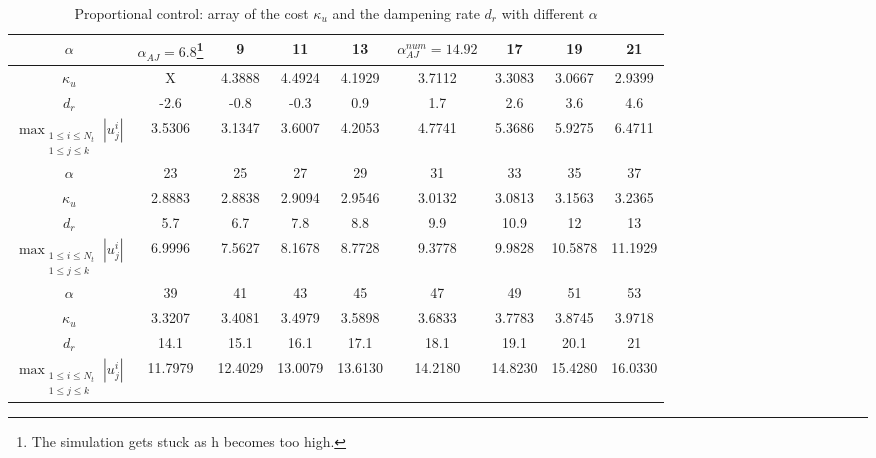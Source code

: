 \documentclass[12pt]{article}
\begin{document}
\begin{table}[ht]
    \caption{Proportional control: array of the cost $\kappa_u$ and the dampening rate $d_r$ with different $\alpha$}
    \label{tab:propctrl_cost}
    \hspace*{-1.75cm}
    \begin{tabular}{ |c|c|c|c|c|c|c|c|c| }
    \hline
    $\alpha$ & $\alpha_{AJ}= 6.8$\footnote{The simulation gets stuck as h becomes too high.}& 9 & 11 & 13& $\alpha_{AJ}^{num}=14.92$ & 17& 19& 21\\
    \hline
    $\kappa_u$ & X & 4.3888 & 4.4924 & 4.1929& 3.7112 & 3.3083& 3.0667 & 2.9399 \\
    $d_r$ & -2.6 & -0.8 & -0.3 & 0.9& 1.7 & 2.6& 3.6 & 4.6 \\ 
    $\max_{\substack{1\leq i \leq N_t \\ 1\leq j \leq k}}|u_j^i|$  & 3.5306 & 3.1347 & 3.6007& 4.2053&4.7741& 5.3686& 5.9275& 6.4711\\
    \hline
    $\alpha$ & 23& 25 & 27 & 29 & 31& {\color{red}33} & {\color{red} 35}& {\color{red} 37}\\
    \hline
    $\kappa_u$ & 2.8883 & 2.8838 & 2.9094 & 2.9546& 3.0132 & {\color{red}3.0813}& {\color{red}3.1563} & {\color{red}3.2365} \\ 
    $d_r$ & 5.7 & 6.7 & 7.8 & 8.8 & 9.9 & {\color{red}10.9} & {\color{red}12} & {\color{red}13}\\
    $\max_{\substack{1\leq i \leq N_t \\ 1\leq j \leq k}}|u_j^i|$  & 6.9996 &7.5627 & 8.1678 &  8.7728& 9.3778& {\color{red}9.9828}& {\color{red}10.5878}& {\color{red}11.1929}\\
    \hline
    $\alpha$ & 39& 41 & 43 & 45 & 47& 49 & 51& 53\\
    \hline
    $\kappa_u$ & 3.3207 & 3.4081 & 3.4979 & 3.5898& 3.6833 & 3.7783& 3.8745 & 3.9718 \\ 
    $d_r$ & 14.1 & 15.1 & 16.1 & 17.1 & 18.1 & 19.1 & 20.1 & 21\\
    $\max_{\substack{1\leq i \leq N_t \\ 1\leq j \leq k}}|u_j^i|$  & 11.7979& 12.4029& 13.0079& 13.6130&14.2180&14.8230&15.4280&16.0330\\
    \hline
    \end{tabular}
\end{table}
\end{document}
